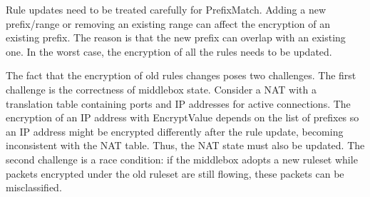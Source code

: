 


\label{sec:updates}
%
Rule updates need to be treated carefully for PrefixMatch.
Adding a new prefix/range or removing an existing range can affect the encryption of an existing 
prefix. The reason is that the new prefix can overlap with an existing one. In the worst case, 
the encryption of all the rules needs to be updated. 

The fact that the encryption of old rules changes poses two challenges.
The first challenge is the correctness of middlebox state. Consider a NAT with a translation table containing ports and IP addresses for active connections. The encryption of an IP address with EncryptValue depends on the list of prefixes so an IP address might be encrypted differently after the rule update, becoming inconsistent with the NAT table.
 Thus, the NAT state must also be updated.
The second challenge is a race condition: if the middlebox adopts a new ruleset while packets encrypted under the old ruleset  are still flowing, these packets can be misclassified.

